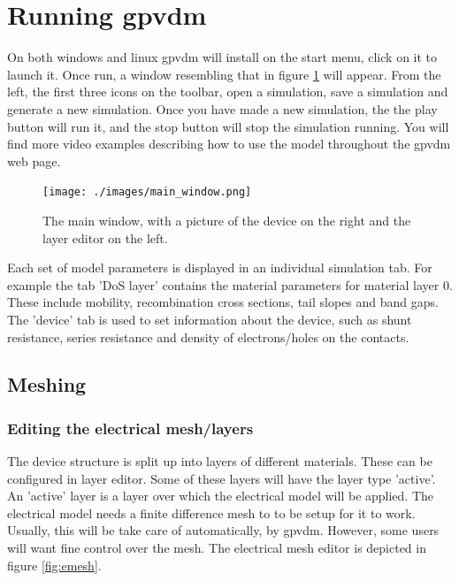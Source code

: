 \documentclass[11pt]{article}
\begin{document}
\section{Running gpvdm}
On both windows and linux gpvdm will install on the start menu, click on it to launch it.  Once run, a window resembling that in figure \ref{fig:mainwindow} will appear.  From the left, the first three icons on the toolbar, open a simulation, save a simulation and generate a new simulation.  Once you have made a new simulation, the the play button will run it, and the stop button will stop the simulation running.  You will find more video examples describing how to use the model throughout the gpvdm web page.

\begin{figure}[ht!]
\centering
\texttt{[image: ./images/main\_window.png]}
\caption{The main window, with a picture of the device on the right and the layer editor on the left.}
\label{fig:mainwindow}
\end{figure}

Each set of model parameters is displayed in an individual simulation tab.  For example the tab 'DoS layer' contains the material parameters for material layer 0.  These include mobility, recombination cross sections, tail slopes and band gaps.  The 'device' tab is used to set information about the device, such as shunt resistance, series resistance and density of electrons/holes on the contacts.

\subsection{Meshing}
\subsubsection{Editing the electrical mesh/layers}
The device structure is split up into layers of different materials.  These can be configured in layer editor.  Some of these layers will have the layer type 'active'.  An 'active' layer is a layer over which the electrical model will be applied.  The electrical model needs a finite difference mesh to to be setup for it to work.  Usually, this will be take care of automatically, by gpvdm.  However, some users will want fine control over the mesh.  The electrical mesh editor is depicted in figure \ref{fig:emesh}.
\end{document}

